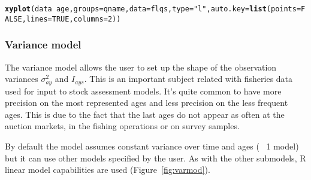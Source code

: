 \documentclass[a4paper,english,10pt]{article}\usepackage[]{graphicx}\usepackage[]{color}
\makeatletter
\newcommand{\hlnum}[1]{\textcolor[rgb]{0.686,0.059,0.569}{#1}}%
\newcommand{\hlstr}[1]{\textcolor[rgb]{0.192,0.494,0.8}{#1}}%
\newcommand{\hlopt}[1]{\textcolor[rgb]{0,0,0}{#1}}%
\newcommand{\hlstd}[1]{\textcolor[rgb]{0.345,0.345,0.345}{#1}}%
\newcommand{\hlkwc}[1]{\textcolor[rgb]{0.333,0.667,0.333}{#1}}%
\newcommand{\hlkwd}[1]{\textcolor[rgb]{0.737,0.353,0.396}{\textbf{#1}}}%
\newenvironment{kframe}{%
 \def\at@end@of@kframe{}%
 \ifinner\ifhmode%
  \def\at@end@of@kframe{\end{minipage}}%
  \begin{minipage}{\columnwidth}%
 \fi\fi%
 \def\FrameCommand##1{\hskip\@totalleftmargin \hskip-\fboxsep
 \colorbox{shadecolor}{##1}\hskip-\fboxsep
     \hskip-\linewidth \hskip-\@totalleftmargin \hskip\columnwidth}%
 \MakeFramed {\advance\hsize-\width
   \@totalleftmargin\z@ \linewidth\hsize
   \@setminipage}}%
 {\par\unskip\endMakeFramed%
 \at@end@of@kframe}
\newenvironment{knitrout}{}{} %
\makeatother
\begin{document}
\begin{knitrout}
\color{fgcolor}\begin{kframe}
\begin{alltt}
\hlkwd{xyplot}\hlstd{(data}\hlopt{~}\hlstd{age,} \hlkwc{groups}\hlstd{=qname,} \hlkwc{data}\hlstd{=flqs,} \hlkwc{type}\hlstd{=}\hlstr{"l"}\hlstd{,} \hlkwc{auto.key}\hlstd{=}\hlkwd{list}\hlstd{(}\hlkwc{points}\hlstd{=}\hlnum{FALSE}\hlstd{,} \hlkwc{lines}\hlstd{=}\hlnum{TRUE}\hlstd{,} \hlkwc{columns}\hlstd{=}\hlnum{2}\hlstd{))}
\end{alltt}


{\ttfamily\noindent\bfseries{}}\end{kframe}
\end{knitrout}

\subsubsection{Variance model}

The variance model allows the user to set up the shape of the observation variances $\sigma^2_{ay}$ and $I_{ays}$. This is an important subject related with fisheries data used for input to stock assessment models. It's quite common to have more precision on the most represented ages and less precision on the less frequent ages. This is due to the fact that the last ages do not appear as often at the auction markets, in the fishing operations or on survey samples.

By default the model assumes constant variance over time and ages (~ 1 model) but it can use other models specified by the user. As with the other submodels, R linear model capabilities are used (Figure~\ref{fig:varmod}).
\end{document}
